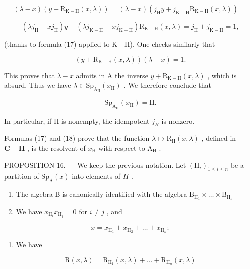 \[
(\lambda - x) (y + \mathrm{R} _ {\mathrm{K-H}} (x, \lambda)) = (\lambda - x) (j _ {\mathrm{H}} y + j _ {\mathrm{K-H}} \mathrm{R} _ {\mathrm{K-H}} (x, \lambda)) =
\]

\[
(\lambda j _ {\mathrm{H}} - x j _ {\mathrm{H}}) y + (\lambda j _ {\mathrm {K-H}} - x j _ {\mathrm {K-H}}) \mathrm{R} _ {\mathrm {K-H}} (x, \lambda) = j _ {\mathrm{H}} + j _ {\mathrm {K-H}} = 1,
\]

(thanks to formula (17) applied to K---H). One checks similarly that

\[
(y + \mathrm{R} _ {\mathrm{K-H}} (x, \lambda)) (\lambda - x) = 1.
\]

This proves that \(\lambda - x\) admits in A the inverse \(y + \mathrm{R}_{\mathrm{K - H}}(x, \lambda)\) , which is absurd. Thus we have \(\lambda \in \mathrm{Sp}_{\mathrm{A_H}}(x_{\mathrm{H}})\) . We therefore conclude that

\[
\mathrm{Sp} _ {\mathrm{A} _ {\mathrm{H}}} (x _ {\mathrm{H}}) = \mathrm{H}.\tag{18}
\]

In particular, if H is nonempty, the idempotent \(j_{H}\) is nonzero.

Formulas (17) and (18) prove that the function \(\lambda \mapsto \mathrm{R}_{\mathrm{H}}(x,\lambda)\) , defined in \(\mathbf{C} - \mathbf{H}\) , is the resolvent of \(x_{\mathrm{H}}\) with respect to \(\mathrm{A_H}\) .

PROPOSITION 16. --- We keep the previous notation. Let \((\mathrm{H}_{i})_{1\leqslant i\leqslant n}\) be a partition of \(\mathrm{Sp}_{\mathrm{A}}(x)\) into elements of \(\Pi\) .

\begin{enumerate}
\def\labelenumi{\alph{enumi})}
\item
  The algebra B is canonically identified with the algebra \(\mathrm{B_{H_1}}\times \dots \times \mathrm{B_{H_n}}\)
\item
  We have \(x_{\mathrm{H}_i}x_{\mathrm{H}_j} = 0\) for \(i\neq j\) , and
\end{enumerate}

\[
x = x _ {\mathrm{H} _ {1}} + x _ {\mathrm{H} _ {2}} + \dots + x _ {\mathrm{H} _ {n}};
\]

\begin{enumerate}
\def\labelenumi{\alph{enumi})}
\setcounter{enumi}{2}
\tightlist
\item
  We have
\end{enumerate}

\[
\mathrm{R} (x, \lambda) = \mathrm{R} _ {\mathrm{H} _ {1}} (x, \lambda) + \dots + \mathrm{R} _ {\mathrm{H} _ {n}} (x, \lambda)\tag{19}
\]

